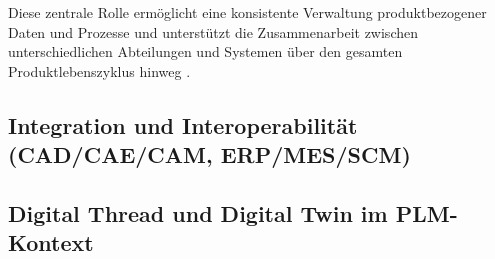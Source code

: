 Diese zentrale Rolle ermöglicht eine konsistente Verwaltung produktbezogener Daten und Prozesse und unterstützt die Zusammenarbeit zwischen unterschiedlichen Abteilungen und Systemen über den gesamten Produktlebenszyklus hinweg \cite{liu2001review}.

%


\subsection{Integration und Interoperabilität (CAD/CAE/CAM, ERP/MES/SCM)}%



\subsection{Digital Thread und Digital Twin im PLM-Kontext}%

